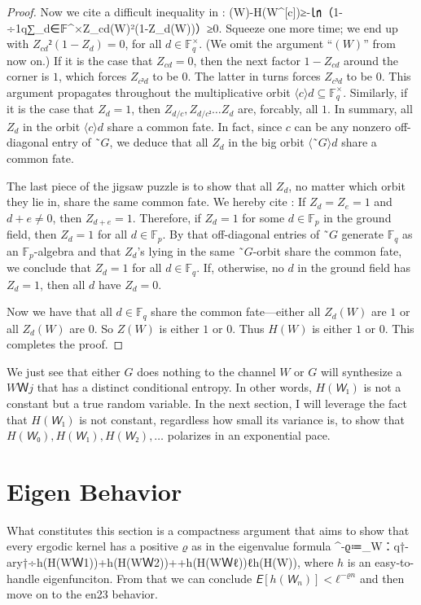 \documentclass[openany]{amsbook}
\numberwithin{equation}{chapter}
\numberwithin{figure}{chapter}
\numberwithin{table}{chapter}
\def\[#1\]{\begin{equation*}{#1}\end{equation*}}
\theoremstyle{definition}	理dfn:Definition~?s			理exa:Example~?s
\theoremstyle{remark}		理cla:Claim~?s				理rem:Remark~?s
\begin{document}
\begin{proof}
		Now we cite a difficult inequality in \cite[Appendix~A]{MT14}:
		\[H(W)-H(W^{[c]})≥-㏑（1-÷1q∑_{d∈𝔽^×}Z_{cd}(W)²(1-Z_d(W))）≥0.\]
		Squeeze one more time;
		we end up with $Z_{cd}²(1-Z_d)=0$, for all $d∈𝔽_q^×$.
		(We omit the argument “$(W)$” from now on.)
		If it is the case that $Z_{cd}=0$, then the next factor $1-Z_{cd}$
		around the corner is $1$, which forces $Z_{c²d}$ to be $0$.
		The latter in turns forces $Z_{c³d}$ to be $0$.
		This argument propagates throughout the multiplicative orbit $⟨c⟩d⊆𝔽_q^×$.
		Similarly, if it is the case that $Z_d=1$,
		then $Z_{d/c},Z_{d/c²}…Z_d$ are, forcably, all $1$.
		In summary, all $Z_d$ in the orbit $⟨c⟩d$ share a common fate.
		In fact, since $c$ can be any nonzero off-diagonal entry of $˜G$,
		we deduce that all $Z_d$ in the big orbit $⟨˜G⟩d$ share a common fate.
		
		The last piece of the jigsaw puzzle is to show that all $Z_d$,
		no matter which orbit they lie in, share the same common fate.
		We hereby cite \cite[Lemma~21]{MT14}:
		If $Z_d=Z_e=1$ and $d+e≠0$, then $Z_{d+e}=1$.
		Therefore, if $Z_d=1$ for some $d∈𝔽_p$ in the ground field,
		then $Z_d=1$ for all $d∈𝔽_p$.
		By that off-diagonal entries of $˜G$ generate $𝔽_q$ as an $𝔽_p$-algebra and
		that $Z_d$'s lying in the same $˜G$-orbit share the common fate,
		we conclude that $Z_d=1$ for all $d∈𝔽_q$.
		If, otherwise, no $d$ in the ground field has $Z_d=1$,
		then all $d$ have $Z_d=0$.
		
		Now we have that all $d∈𝔽_q$ share the common fate---either
		all $Z_d(W)$ are $1$ or all $Z_d(W)$ are $0$.
		So $Z(W)$ is either $1$ or $0$.
		Thus $H(W)$ is either $1$ or $0$.
		This completes the proof.
	\end{proof}
	
	We just see that either $G$ does nothing to the channel $W$
	or $G$ will synthesize a $WＷj$ that has a distinct conditional entropy.
	In other words, $H(𝘞₁)$ is not a constant but a true random variable.
	In the next section, I will leverage the fact that $H(𝘞₁)$ is not constant,
	regardless how small its variance is, to show that
	$H(𝘞₀),H(𝘞₁),H(𝘞₂),\dotsc$ polarizes in an exponential pace.

\section{Eigen Behavior}\label{sec:eigen}

	What constitutes this section is a compactness argument that aims to show that
	every ergodic kernel has a positive $ϱ$ as in the eigenvalue formula
	\[ℓ^{-ϱ}≔\sup_{W：q†-ary†}÷{h(H(WＷ1))+h(H(WＷ2))+\dotsb+h(H(WＷ{ℓ}))}{ℓh(H(W))},
		\label{sup:dmc}\]
	where $h$ is an easy-to-handle eigenfunciton.
	From that we can conclude $𝘌[h(𝘞_n)]<ℓ^{-ϱn}$
	and then move on to the en23 behavior.
	
\end{document}
